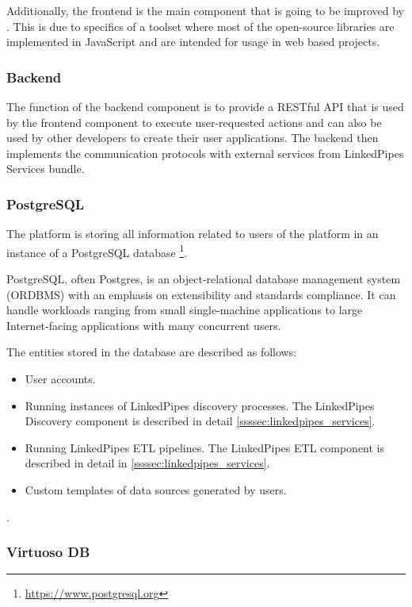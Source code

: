 Additionally, the \lpa{} frontend is the main component that is going to be improved by \lpas{}. This is due to specifics of a \solid{} toolset where most of the open-source libraries are implemented in JavaScript and are intended for usage in web based projects.

\subsubsection{Backend}

The function of the backend component is to provide a RESTful API that is used by the frontend component to execute user-requested actions and can also be used by other developers to create their user applications. The backend then implements the communication protocols with external services from LinkedPipes Services bundle. 

\subsubsection{PostgreSQL} 

The \lpa{} platform is storing all information related to users of the platform in an instance of a PostgreSQL database \footnote{\url{https://www.postgresql.org}}. 

PostgreSQL, often Postgres, is an object-relational database management system (ORDBMS) with an emphasis on extensibility and standards compliance. It can handle workloads ranging from small single-machine applications to large Internet-facing applications with many concurrent users.

The entities stored in the database are described as follows:
\begin{itemize}
\item User accounts.
\item Running instances of LinkedPipes discovery processes. The LinkedPipes Discovery component is described in detail \autoref{ssssec:linkedpipes_services}.
\item Running LinkedPipes ETL pipelines. The LinkedPipes ETL component is described in detail in \autoref{ssssec:linkedpipes_services}.
\item Custom templates of data sources generated by users.
\end{itemize}.

\subsubsection{Virtuoso DB}

